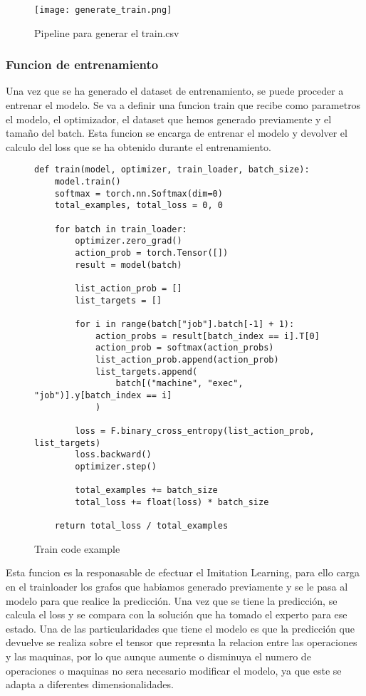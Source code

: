 \begin{figure}[ht]
    \centering
    \texttt{[image: generate\_train.png]}
    \caption{Pipeline para generar el train.csv}
    \label{fig:trainingpipeline}
\end{figure}

\subsubsection{Funcion de entrenamiento}
Una vez que se ha generado el dataset de entrenamiento, se puede proceder a entrenar el modelo.
Se va a definir una funcion train que recibe como parametros el modelo, el optimizador, el dataset
que hemos generado previamente y el tamaño del batch. Esta funcion se encarga de entrenar el modelo
y devolver el calculo del loss que se ha obtenido durante el entrenamiento.\medskip

\begin{figure}[ht]
\begin{lstlisting}
def train(model, optimizer, train_loader, batch_size):
    model.train()
    softmax = torch.nn.Softmax(dim=0)
    total_examples, total_loss = 0, 0

    for batch in train_loader:
        optimizer.zero_grad()
        action_prob = torch.Tensor([])
        result = model(batch)

        list_action_prob = []
        list_targets = []

        for i in range(batch["job"].batch[-1] + 1):
            action_probs = result[batch_index == i].T[0]
            action_prob = softmax(action_probs)
            list_action_prob.append(action_prob)
            list_targets.append(
                batch[("machine", "exec", "job")].y[batch_index == i]
            )

        loss = F.binary_cross_entropy(list_action_prob, list_targets)
        loss.backward()
        optimizer.step()

        total_examples += batch_size
        total_loss += float(loss) * batch_size

    return total_loss / total_examples 
\end{lstlisting}\medskip
    \caption{Train code example}
    \label{fig:traincode}
\end{figure}

Esta funcion es la responasable de efectuar el Imitation Learning, para ello carga en el
trainloader los grafos que habiamos generado previamente y se le pasa al modelo para que
realice la predicción. Una vez que se tiene la predicción, se calcula el loss y se compara
con la solución que ha tomado el experto para ese estado. Una de las particularidades que
tiene el modelo es que la predicción que devuelve se realiza sobre el tensor que represnta 
la relacion entre las operaciones y las maquinas, por lo que aunque aumente o disminuya 
el numero de operaciones o maquinas no sera necesario modificar el modelo, ya que este 
se adapta a diferentes dimensionalidades.


